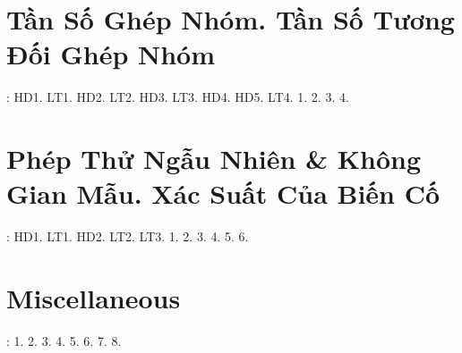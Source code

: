 \documentclass{article}
\begin{document}

\section{Tần Số Ghép Nhóm. Tần Số Tương Đối Ghép Nhóm}
\cite[Chap. VI, \S3, pp. 24--34]{SGK_Toan_9_Canh_Dieu_tap_2}: HD1. LT1. HD2. LT2. HD3. LT3. HD4. HD5. LT4. 1. 2. 3. 4.


\section{Phép Thử Ngẫu Nhiên \& Không Gian Mẫu. Xác Suất Của Biến Cố}
\cite[Chap. VI, \S4, pp. 35--39]{SGK_Toan_9_Canh_Dieu_tap_2}: HD1. LT1. HD2. LT2. LT3. 1. 2. 3. 4. 5. 6.


\section{Miscellaneous}
\cite[BTCCVI, pp. 40--42]{SGK_Toan_9_Canh_Dieu_tap_2}: 1. 2. 3. 4. 5. 6. 7. 8.


\printbibliography[heading=bibintoc]
	
\end{document}
